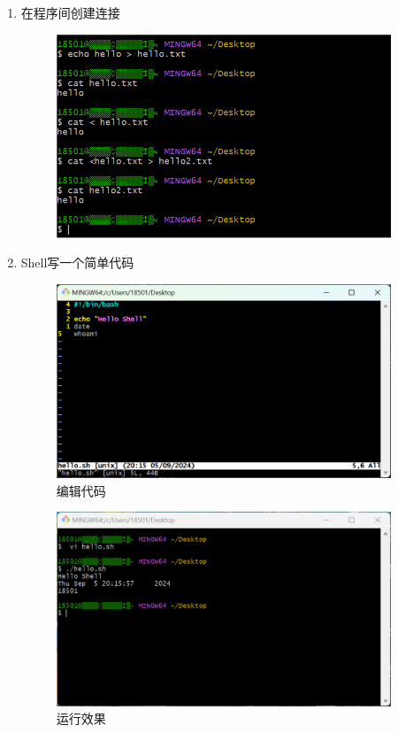 \documentclass{ctexart}
\begin{document}
\begin{enumerate}
  \item 在程序间创建连接
  \begin{figure}[H]
     \centering
     \includegraphics[width=10cm]{7d83e34fe5dbaf8dc4993da380f66ebf.png}
     \caption{}
     \label{fig:3}
 \end{figure}

 \item Shell写一个简单代码
 \begin{figure}[H]
    \centering
    \includegraphics[width=10cm]{30de7a46c6cf548c2a7197eecba96203.png}
    \caption{编辑代码}
    \label{fig:3}
\end{figure}
 \begin{figure}[H]
    \centering
    \includegraphics[width=10cm]{b1394dbef03c95aff4c1ac265715c22f.png}
    \caption{运行效果}
    \label{fig:3}
\end{figure}


\end{enumerate}
\end{document}
